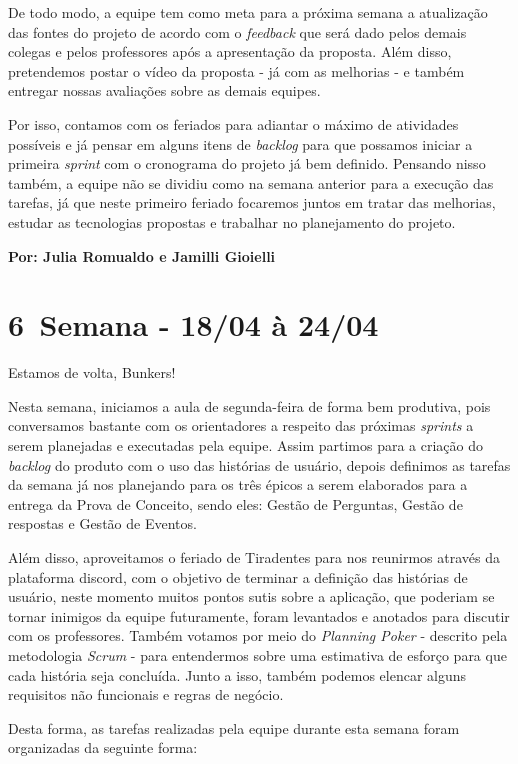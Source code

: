 De todo modo, a equipe tem como meta para a próxima semana a atualização das fontes do projeto de acordo com o \textsl{feedback} que será dado pelos demais colegas e pelos professores após a apresentação da proposta. Além disso, pretendemos postar o vídeo da proposta - já com as melhorias - e também entregar nossas avaliações sobre as demais equipes.

Por isso, contamos com os feriados para adiantar o máximo de atividades possíveis e já pensar em alguns itens de \textsl{backlog} para que possamos iniciar a primeira \textsl{sprint} com o cronograma do projeto já bem definido. Pensando nisso também, a equipe não se dividiu como na semana anterior para a execução das tarefas, já que neste primeiro feriado focaremos juntos em tratar das melhorias, estudar as tecnologias propostas e trabalhar no planejamento do projeto.

\textbf{Por: Julia Romualdo e Jamilli Gioielli}

\section{6\textordfeminine \, Semana - 18/04 à 24/04}
Estamos de volta, Bunkers!

Nesta semana, iniciamos a aula de segunda-feira de forma bem produtiva, pois conversamos bastante com os orientadores a respeito das próximas \textsl{sprints} a serem planejadas e executadas pela equipe. Assim partimos para a criação do \textsl{backlog} do produto com o uso das histórias de usuário, depois definimos as tarefas da semana já nos planejando para os três épicos a serem elaborados para a entrega da Prova de Conceito, sendo eles: Gestão de Perguntas, Gestão de respostas e Gestão de Eventos.

Além disso, aproveitamos o feriado de Tiradentes para nos reunirmos através da plataforma \gls{discord}, com o objetivo de terminar a definição das histórias de usuário, neste momento muitos pontos sutis sobre a aplicação, que poderiam se tornar inimigos da equipe futuramente, foram levantados e anotados para discutir com os professores. Também votamos por meio do \textsl{Planning Poker} - descrito pela metodologia \textsl{Scrum} - para entendermos sobre uma estimativa de esforço para que cada história seja concluída. Junto a isso, também podemos elencar alguns requisitos não funcionais e regras de negócio.

Desta forma, as tarefas realizadas pela equipe durante esta semana foram organizadas da seguinte forma:

